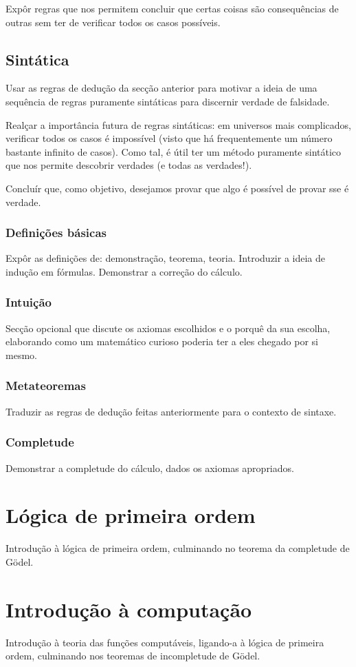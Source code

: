 \documentclass{report}
\theoremstyle{definition}
\theoremstyle{remark}
\begin{document}
	Expôr regras que nos permitem concluir que certas coisas são consequências de outras sem ter de verificar todos os casos possíveis.
	
	\section{Sintática}
	
	Usar as regras de dedução da secção anterior para motivar a ideia de uma sequência de regras puramente sintáticas para discernir verdade de falsidade.
	
	Realçar a importância futura de regras sintáticas: em universos mais complicados, verificar todos os casos é impossível (visto que há frequentemente um número bastante infinito de casos). Como tal, é útil ter um método puramente sintático que nos permite descobrir verdades (e todas as verdades!).
	
	Concluír que, como objetivo, desejamos provar que algo é possível de provar sse é verdade.
	
	\subsection{Definições básicas}
	
	Expôr as definições de: demonstração, teorema, teoria. Introduzir a ideia de indução em fórmulas. Demonstrar a correção do cálculo.
	
	\subsection{Intuição}
	
	Secção opcional que discute os axiomas escolhidos e o porquê da sua escolha, elaborando como um matemático curioso poderia ter a eles chegado por si mesmo.
	
	\subsection{Metateoremas}
	
	Traduzir as regras de dedução feitas anteriormente para o contexto de sintaxe.
	
	\subsection{Completude}
	
	Demonstrar a completude do cálculo, dados os axiomas apropriados.
	
	\chapter{Lógica de primeira ordem}
	
	Introdução à lógica de primeira ordem, culminando no teorema da completude de Gödel.
	
	\chapter{Introdução à computação}
	
	Introdução à teoria das funções computáveis, ligando-a à lógica de primeira ordem, culminando nos teoremas de incompletude de Gödel.
	
\end{document}
